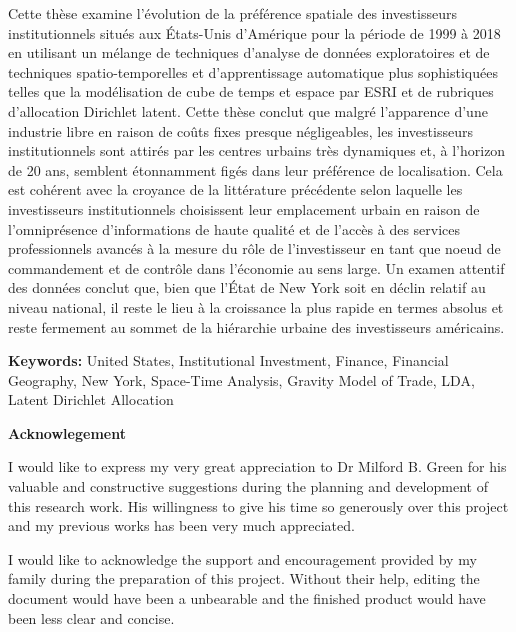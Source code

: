 \documentclass[12pt,letterpaper]{book}
\numberwithin{figure}{chapter}
\newenvironment{preliminary}%
{\pagestyle{plain}\pagenumbering{roman}}%
{\pagenumbering{arabic}}
\newcommand{\makeacknowlege} {
\Large\begin{center}\textbf{Acknowlegement}\end{center}\normalsize

\begin{spacing}{2}
I would like to express my very great appreciation to Dr Milford B. Green for his valuable and constructive suggestions during the planning and development of this research work. His willingness to give his time so generously over this project and my previous works has been very much appreciated. \newline
  
I would like to acknowledge the support and encouragement provided by my family during the preparation of this project. Without their help, editing the document would have been a unbearable and the finished product would have been less clear and concise.     
\end{spacing}  
}
\begin{document}
\begin{preliminary}
\begin{spacing}{2}
Cette th\`{e}se examine l'\'{e}volution de la pr\'{e}f\'{e}rence spatiale des investisseurs institutionnels situ\'{e}s aux \'{E}tats-Unis d'Am\'{e}rique pour la p\'{e}riode de 1999 \`{a} 2018 en utilisant un m\'{e}lange de techniques d'analyse de donn\'{e}es exploratoires et de techniques spatio-temporelles et d'apprentissage automatique plus sophistiqu\'{e}es telles que la mod\'{e}lisation de cube de temps et espace par ESRI et de rubriques d'allocation Dirichlet latent. Cette th\`{e}se conclut que malgr\'{e} l'apparence d'une industrie libre en raison de co\^{u}ts fixes presque n\'{e}gligeables, les investisseurs institutionnels sont attir\'{e}s par les centres urbains tr\`{e}s dynamiques et, \`{a} l'horizon de 20 ans, semblent \'{e}tonnamment fig\'{e}s dans leur pr\'{e}f\'{e}rence de localisation. Cela est coh\'{e}rent avec la croyance de la litt\'{e}rature pr\'{e}c\'{e}dente selon laquelle les investisseurs institutionnels choisissent leur emplacement urbain en raison de l'omnipr\'{e}sence d'informations de haute qualit\'{e} et de l'acc\`{e}s \`{a} des services professionnels avanc\'{e}s \`{a} la mesure du r\^{o}le de l'investisseur en tant que noeud de commandement et de contr\^{o}le dans l'\'{e}conomie au sens large. Un examen attentif des donn\'{e}es conclut que, bien que l'\'{E}tat de New York soit en d\'{e}clin relatif au niveau national, il reste le lieu \`{a} la croissance la plus rapide en termes absolus et reste fermement au sommet de la hi\'{e}rarchie urbaine des investisseurs am\'{e}ricains.
	
 
\end{spacing}



\vfill
\textbf{Keywords:} United States, Institutional Investment, Finance, Financial Geography, New York, Space-Time Analysis, Gravity Model of Trade, LDA, Latent Dirichlet Allocation 
\newpage
\begin{spacing}{2}
\makeacknowlege\newpage
\newpage
\tableofcontents\newpage
\newpage


\listoffigures
\newpage
{}
\listoftables\newpage
{}
\end{spacing}
\end{preliminary}
\end{document}

